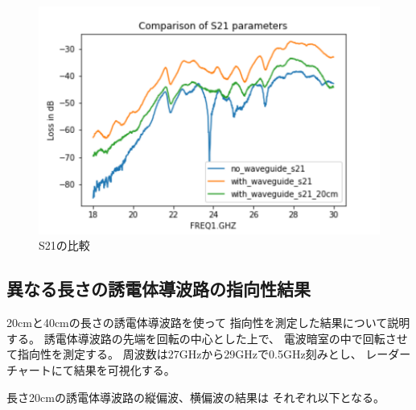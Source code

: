 \documentclass[technicalreport]{ieicej}
\begin{document}
\begin{figure}[tb]
  \begin{center}
    \includegraphics[bb=0 0 432.098422 288.065615, width=1.0\linewidth]{img/s21_comparison.pdf}
    \caption{S21の比較}
    \label{fig:s21_comparison}
  \end{center}
\end{figure}

\subsection{異なる長さの誘電体導波路の指向性結果}

20cmと40cmの長さの誘電体導波路を使って
指向性を測定した結果について説明する。
誘電体導波路の先端を回転の中心とした上で、
電波暗室の中で回転させて指向性を測定する。
周波数は27GHzから29GHzで0.5GHz刻みとし、
レーダーチャートにて結果を可視化する。

長さ20cmの誘電体導波路の縦偏波、横偏波の結果は
それぞれ以下となる。
\end{document}
